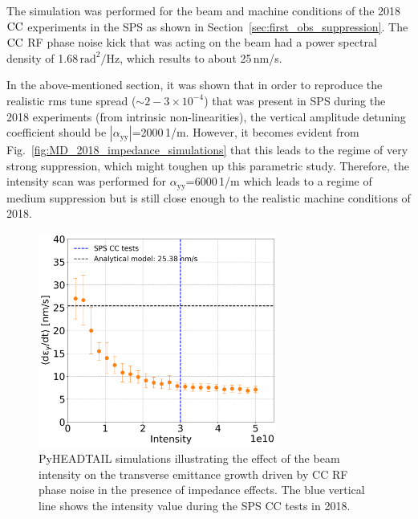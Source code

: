 The simulation was performed for the beam and machine conditions of the 2018 ${\mathrm{CC}}$ experiments in the SPS as shown in Section~\ref{sec:first_obs_suppression}. The ${\mathrm{CC}}$ RF phase noise kick that was acting on the beam had a power spectral density of 1.68\,$\mathrm{rad^2/Hz}$, which results to about 25\,nm/s. 

In the above-mentioned section, it was shown that in order to reproduce the realistic rms tune spread ($\sim 2-3 \times 10^{-4}$) that was present in SPS during the 2018 experiments (from intrinsic non-linearities), the vertical amplitude detuning coefficient should be $| \alpha_\mathrm{yy} |$=2000\,1/m. However, it becomes evident from Fig.~\ref{fig:MD_2018_impedance_simulations} that this leads to the regime of very strong suppression, which might toughen up this parametric study. Therefore, the intensity scan was performed for $\alpha_\mathrm{yy}$=6000\,1/m which leads to a regime of medium suppression but is still close enough to the realistic machine conditions of 2018.


\begin{figure}[!h] 
    \centering         
    \includegraphics[width=0.7\textwidth]{images/Ch7/sps_270GeV_PN1e-8_400MHz_QpxQpy5e-1_ayy6000_intensity_spsCCtests.png}
        \caption{PyHEADTAIL simulations illustrating the effect of the beam intensity on the transverse emittance growth driven by CC RF phase noise in the presence of impedance effects. The blue vertical line shows the intensity value during the SPS CC tests in 2018.}
        \label{fig:study_8_intensity_scan}
 \end{figure}

